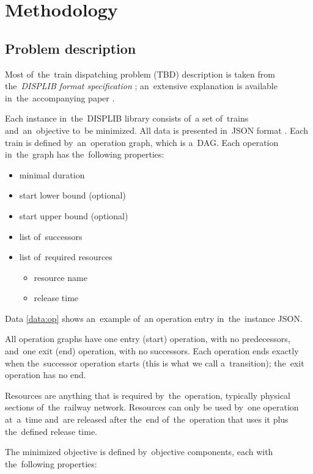 \chapter{Methodology}
\label{chap:method}

\section{Problem description}
Most of~the~train dispatching problem (TBD) description is taken from the~\emph{DISPLIB format specification} \cite{kloster2025displibspec}; an~extensive explanation is available in~the~accompanying paper \cite{kloster2025displiblibrarytraindispatching}.

Each instance in~the~DISPLIB library consists of~a set of~trains and~an~objective to~be minimized. All data is presented in~JSON format \cite{pezoa2016foundations}. Each train is defined by~an~operation graph, which is a~DAG. Each operation in~the~graph has the~following properties:

\begin{itemize}
    \item minimal duration
    \item start lower bound (optional)
    \item start upper bound (optional)
    \item list of~successors
    \item list of~required resources
    \begin{itemize}
        \item resource name
        \item release time
    \end{itemize}
\end{itemize}    

Data \ref{data:op} shows an~example of~an operation entry in~the~instance JSON.

All operation graphs have one entry (start) operation, with no predecessors, and~one exit (end) operation, with no successors. Each operation ends exactly when the~successor operation starts (this is what we call a~transition); the~exit operation has no end. 

Resources are anything that is required by~the~operation, typically physical sections of~the~railway network. Resources can only be used by~one operation at~a~time and~are released after the~end of~the~operation that uses it plus the~defined release time.

The minimized objective is defined by~objective components, each with the~following properties: 

